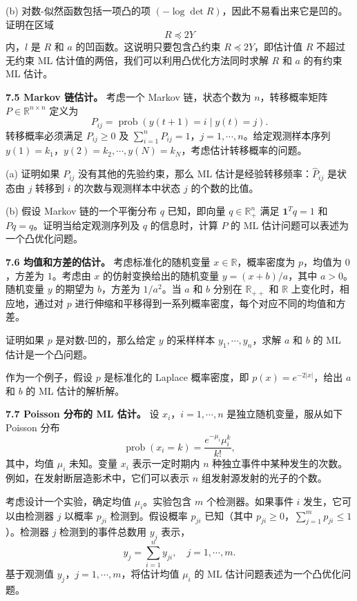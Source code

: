 \documentclass[UTF8, 12pt, fontset=fandol, oneside]{ctexart}
\begin{document}
(b) 对数-似然函数包括一项凸的项 $(-\log\det R)$，因此不易看出来它是凹的。证明在区域
\[
R\preceq 2Y
\]
内，$l$ 是 $R$ 和 $a$ 的凹函数。这说明只要包含凸约束 $R\preceq 2Y$，即估计值 $R$ 不超过无约束 ML 估计值的两倍，我们可以利用凸优化方法同时求解 $R$ 和 $a$ 的有约束 ML 估计。

\noindent\textbf{7.5 Markov 链估计。}\quad
考虑一个 Markov 链，状态个数为 $n$，转移概率矩阵 $P\in\mathbb{R}^{n\times n}$ 定义为
\[
P_{ij}=\operatorname{prob}(y(t+1)=i\mid y(t)=j).
\]
转移概率必须满足 $P_{ij}\geq 0$ 及 $\sum_{i=1}^nP_{ij}=1$，$j=1,\cdots,n$。给定观测样本序列 $y(1)=k_1$，$y(2)=k_2,\cdots,y(N)=k_N$，考虑估计转移概率的问题。

(a) 证明如果 $P_{ij}$ 没有其他的先验约束，那么 ML 估计是经验转移频率：$\hat{P}_{ij}$ 是状态由 $j$ 转移到 $i$ 的次数与观测样本中状态 $j$ 的个数的比值。

(b) 假设 Markov 链的一个平衡分布 $q$ 已知，即向量 $q\in\mathbb{R}_+^n$ 满足 $\mathbf{1}^Tq=1$ 和 $Pq=q$。证明当给定观测序列及 $q$ 的信息时，计算 $P$ 的 ML 估计问题可以表述为一个凸优化问题。

\noindent\textbf{7.6 均值和方差的估计。}\quad
考虑标准化的随机变量 $x\in\mathbb{R}$，概率密度为 $p$，均值为 $0$，方差为 $1$。考虑由 $x$ 的仿射变换给出的随机变量 $y=(x+b)/a$，其中 $a>0$。随机变量 $y$ 的期望为 $b$，方差为 $1/a^2$。当 $a$ 和 $b$ 分别在 $\mathbb{R}_{++}$ 和 $\mathbb{R}$ 上变化时，相应地，通过对 $p$ 进行伸缩和平移得到一系列概率密度，每个对应不同的均值和方差。

证明如果 $p$ 是对数-凹的，那么给定 $y$ 的采样样本 $y_1,\cdots,y_n$，求解 $a$ 和 $b$ 的 ML 估计是一个凸问题。

作为一个例子，假设 $p$ 是标准化的 Laplace 概率密度，即 $p(x)=e^{-2|x|}$，给出 $a$ 和 $b$ 的 ML 估计的解析解。

\noindent\textbf{7.7 Poisson 分布的 ML 估计。}\quad
设 $x_i$，$i=1,\cdots,n$ 是独立随机变量，服从如下 Poisson 分布
\[
\operatorname{prob}(x_i=k)=\frac{e^{-\mu_i}\mu_i^k}{k!},
\]
其中，均值 $\mu_i$ 未知。变量 $x_i$ 表示一定时期内 $n$ 种独立事件中某种发生的次数。例如，在发射断层造影术中，它们可以表示 $n$ 组发射源发射的光子的个数。

考虑设计一个实验，确定均值 $\mu_i$。实验包含 $m$ 个检测器。如果事件 $i$ 发生，它可以由检测器 $j$ 以概率 $p_{ji}$ 检测到。假设概率 $p_{ji}$ 已知（其中 $p_{ji}\geq 0$，$\sum_{j=1}^m p_{ji}\leq 1$）。检测器 $j$ 检测到的事件总数用 $y_j$ 表示，
\[
y_j=\sum_{i=1}^n y_{ji},\quad j=1,\cdots,m.
\]
基于观测值 $y_j$，$j=1,\cdots,m$，将估计均值 $\mu_i$ 的 ML 估计问题表述为一个凸优化问题。
\end{document}

